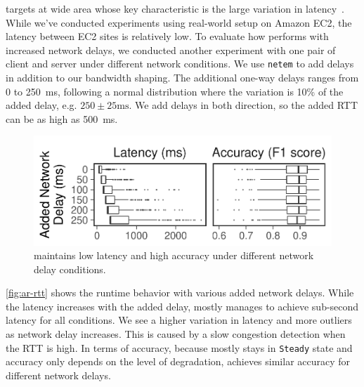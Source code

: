  \sysname{} targets at wide area
whose key characteristic is the large variation in
latency~\cite{li2010cloudcmp}. While we've conducted experiments using
real-world setup on Amazon EC2, the latency between EC2 sites is relatively low.
To evaluate how \sysname{} performs with increased network delays, we conducted
another experiment with one pair of client and server under different network
conditions. We use \texttt{netem} to add delays in addition to our bandwidth
shaping. The additional one-way delays ranges from 0 to \SI{250}{ms}, following
a normal distribution where the variation is 10\% of the added delay, e.g.
$250\pm 25\text{ms}$. We add delays in both direction, so the added RTT can be
as high as \SI{500}{ms}.

\begin{figure}
  \centering
  \includegraphics[width=.9\columnwidth]{figures/runtime_darknet-bench.pdf}
  \caption{\sysname{} maintains low latency and high accuracy under different
    network delay conditions.}
  \label{fig:ar-rtt}
  \vspace{-1em}
\end{figure}

\autoref{fig:ar-rtt} shows the runtime behavior with various added network
delays. While the latency increases with the added delay, \sysname{} mostly
manages to achieve sub-second latency for all conditions. We see a higher
variation in latency and more outliers as network delay increases. This is
caused by a slow congestion detection when the RTT is high. In terms of
accuracy, because \sysname{} mostly stays in \texttt{Steady} state and accuracy
only depends on the level of degradation, \sysname{} achieves similar accuracy
for different network delays.

